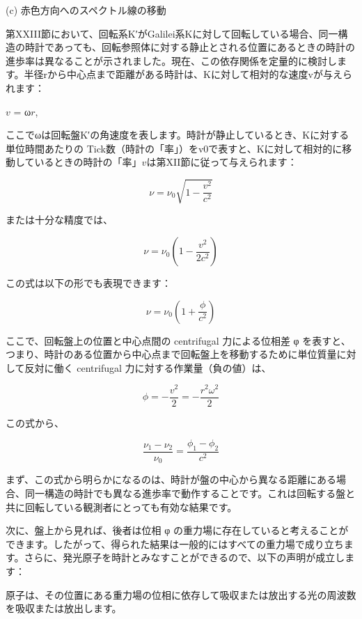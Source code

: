 \documentclass[a4paper,11pt,openany]{ltjsbook}
\begin{document}
(c) 赤色方向へのスペクトル線の移動

第XXIII節において、回転系K′がGalilei系Kに対して回転している場合、同一構造の時計であっても、回転参照体に対する静止とされる位置にあるときの時計の進歩率は異なることが示されました。現在、この依存関係を定量的に検討します。半径rから中心点まで距離がある時計は、Kに対して相対的な速度vが与えられます：

$v$ = ω$r$,


ここでωは回転盤K′の角速度を表します。時計が静止しているとき、Kに対する単位時間あたりの Tick数（時計の「率」）をv0で表すと、Kに対して相対的に移動しているときの時計の「率」$v$は第XII節に従って与えられます：



\[ \nu = \nu_0 \sqrt{1 - \frac{v^2}{c^2}} \]




または十分な精度では、



\[ \nu = \nu_0 \left(1 - \frac{v^2}{2c^2}\right) \]




この式は以下の形でも表現できます：



\[ \nu = \nu_0 \left(1 + \frac{\phi}{c^2}\right) \]




ここで、回転盤上の位置と中心点間の centrifugal 力による位相差 φ を表すと、つまり、時計のある位置から中心点まで回転盤上を移動するために単位質量に対して反対に働く centrifugal 力に対する作業量（負の値）は、



\[ \phi = -\frac{v^2}{2} = -\frac{r^2 \omega^2}{2} \]




この式から、



\[ \frac{\nu_1 - \nu_2}{\nu_0} = \frac{\phi_1 - \phi_2}{c^2} \]




まず、この式から明らかになるのは、時計が盤の中心から異なる距離にある場合、同一構造の時計でも異なる進歩率で動作することです。これは回転する盤と共に回転している観測者にとっても有効な結果です。

次に、盤上から見れば、後者は位相 φ の重力場に存在していると考えることができます。したがって、得られた結果は一般的にはすべての重力場で成り立ちます。さらに、発光原子を時計とみなすことができるので、以下の声明が成立します：

原子は、その位置にある重力場の位相に依存して吸収または放出する光の周波数を吸収または放出します。
\end{document}
